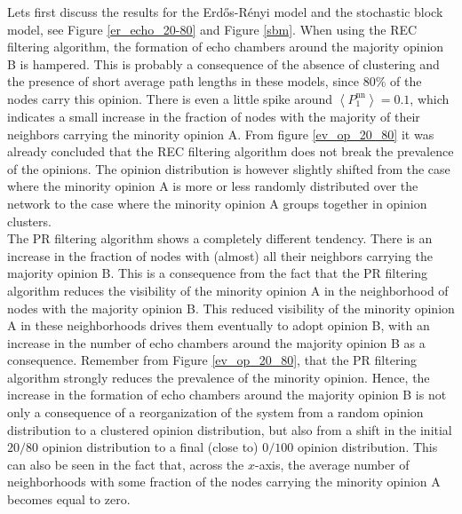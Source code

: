 \documentclass[11 pt , letterpaper , twoside , openright]{book}
\begin{document}
\noindent
Lets first discuss the results for the Erd\H{o}s-R\'{e}nyi model and the stochastic block model, see Figure \ref{er_echo_20-80} and Figure \ref{sbm}. When using the REC filtering algorithm, the formation of echo chambers around the majority opinion B is hampered. This is probably a consequence of the absence of clustering and the presence of short average path lengths in these models, since $80\%$ of the nodes carry this opinion. There is even a little spike around $\left<P_1^{\text{nn}}\right> = 0.1$, which indicates a small increase in the fraction of nodes with the majority of their neighbors carrying the minority opinion A. From figure \ref{ev_op_20_80} it was already concluded that the REC filtering algorithm does not break the prevalence of the opinions. The opinion distribution is however slightly shifted from the case where the minority opinion A is more or less randomly distributed over the network to the case where the minority opinion A groups together in opinion clusters. \\
\newline
The PR filtering algorithm shows a completely different tendency. There is an increase in the fraction of nodes with (almost) all their neighbors carrying the majority opinion B. This is a consequence from the fact that the PR filtering algorithm reduces the visibility of the minority opinion A in the neighborhood of nodes with the majority opinion B. This reduced visibility of the minority opinion A in these neighborhoods drives them eventually to adopt opinion B, with an increase in the number of echo chambers around the majority opinion B as a consequence. Remember from Figure \ref{ev_op_20_80}, that the PR filtering algorithm strongly reduces the prevalence of the minority opinion. Hence, the increase in the formation of echo chambers around the majority opinion B is not only a consequence of a reorganization of the system from a random opinion distribution to a clustered opinion distribution, but also from a shift in the initial $20/80$ opinion distribution to a final (close to) $0/100$ opinion distribution. This can also be seen in the fact that, across the $x$-axis, the average number of neighborhoods with some fraction of the nodes carrying the minority opinion A becomes equal to zero. \\
\newline
\end{document}
